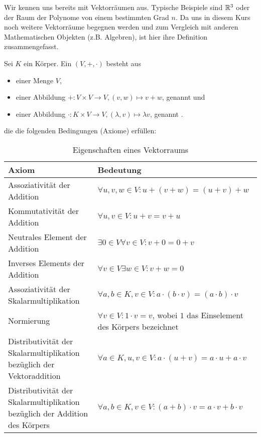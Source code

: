 Wir kennen uns bereits mit Vektorräumen aus. Typische Beispiele sind $\mathbb{R}^3$ oder der Raum der Polynome von einem bestimmten Grad $n$. Da uns in diesem Kurs noch weitere Vektorräume begegnen werden und zum Vergleich mit anderen Mathematischen Objekten (z.B. Algebren), ist hier ihre Definition zusammengefasst.


\begin{definition}[Vektorräume]\label{vektorraeume:def}
	Sei $K$ ein Körper. Ein  $(V,+,\cdot)$ besteht aus
	\begin{itemize}
		\item einer Menge $V$,
		\item einer Abbildung $+: V \times V \to V, (v,w) \mapsto v+w$, genannt  und
		\item einer Abbildung $\cdot: K \times V \to V, (\lambda,v) \mapsto \lambda v$, genannt .
	\end{itemize}
	die die folgenden Bedingungen (Axiome) erfüllen:
		
		\begin{table}[!ht]
			\setlength\extrarowheight{10pt} %
			\begin{tabularx}{\textwidth}{p{7cm} X}
				
				\toprule
				\textbf{Axiom}                                                              & \textbf{Bedeutung} \\
				\midrule
				Assoziativität der Addition                                                 & $\forall u,v,w\in V: u+(v+w) = (u+v)+w$  \\
				Kommutativität der Addition                                                 & $\forall u,v\in V: u+v=v+u$ \\
				Neutrales Element der Addition                                              & $\exists 0\in V\forall v\in V: v+0=0+v$  \\
				Inverses Elements der Addition                                              & $\forall v \in V\exists w \in V: v+w=0$ \\
				Assoziativität der Skalarmultiplikation                                     & $\forall a,b\in K, v\in V: a\cdot(b\cdot v) = (a\cdot b)\cdot v$ \\
				Normierung                                                                  & $\forall v \in V: 1 \cdot v = v$, wobei $1$ das Einselement des Körpers bezeichnet \\
				Distributivität der Skalarmultiplikation bezüglich der Vektoraddition       & $\forall a\in K, u,v\in V: a\cdot(u + v) = a\cdot u + a\cdot v$ \\
				Distributivität der Skalarmultiplikation bezüglich der Addition des Körpers & $\forall a,b\in K, v\in V: (a + b)\cdot v = a\cdot v + b\cdot v$ \\
				\bottomrule
			\end{tabularx}
			\caption{Eigenschaften eines Vektorraums}
		\end{table}
\end{definition}